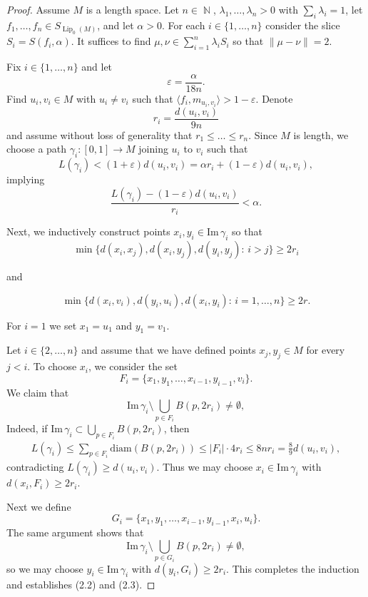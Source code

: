 \documentclass[10pt,a4paper]{amsart}
\DeclareMathOperator{\Lip}{Lip}
\DeclareMathOperator{\N}{\mathbb{N}}
\begin{document}
\begin{proof}
Assume $M$ is a length space. 
    Let $n\in \N$, $\lambda_1,\ldots,\lambda_n>0$ with $\sum_i\lambda_i=1$,
    let $f_1,\ldots,f_n\in S_{\Lip_0(M)}$, and let $\alpha>0$. For each $i\in \{1,\ldots,n\}$ consider the slice $S_i=S(f_i,\alpha)$. It suffices to find $\mu,\nu\in \sum_{i=1}^n \lambda_iS_i$ so that $\|\mu-\nu\|=2$.


Fix $i\in \{1,\ldots,n\}$ and let 
\[\varepsilon=\frac{\alpha}{18n}.\]  
Find $u_i,v_i\in M$ with $u_i\neq v_i$ such that
$\langle f_i,m_{u_i,v_i}\rangle>1-\varepsilon$. Denote
\[
r_i=\frac{d(u_i,v_i)}{9n}
\]
and assume without loss of generality that $r_1\leq\ldots\leq r_n$. 
Since $M$ is length, we choose a path $\gamma_i:[0,1]\to M$ joining $u_i$ to $v_i$
such that
\[L(\gamma_i)<(1+\varepsilon)d(u_i,v_i)=\alpha r_i+(1-\varepsilon)d(u_i,v_i),\]
implying
\begin{equation}
\frac{L(\gamma_i)-(1-\varepsilon)d(u_i,v_i)}{r_i}<\alpha.
\end{equation}


Next, we inductively construct points $x_i,y_i\in\mathrm{Im}\,\gamma_i$
so that
\begin{equation}
\min\{d(x_i,x_j),d(x_i,y_j),d(y_i,y_j):\, i>j\}\ge 2r_i
\end{equation}

and

\begin{equation}\tag{2.3}
\min\{d(x_i,v_i),d(y_i,u_i),d(x_i,y_i):\, i=1,\dots,n\}\ge 2r.
\end{equation}

For $i=1$ we set $x_1=u_1$ and $y_1=v_1$.

Let $i\in \{2,\ldots,n\}$ and assume that we have defined points $x_j,y_j\in M$ for every $j<i$. 
To choose $x_i$, we consider the set
\[
F_i=\{x_1,y_1,\dots,x_{i-1},y_{i-1},v_i\}.
\]
We claim that
\[
\mathrm{Im}\,\gamma_i
\setminus\bigcup_{p\in F_i} B(p,2r_i)
\neq\emptyset,
\]
Indeed, if $\mathrm{Im}\,\gamma_i\subset \bigcup_{p\in F_i}B(p,2r_i)$, then
\begin{align*}
 L(\gamma_i)
\le \sum_{p\in F_i}\mathrm{diam}(B(p,2r_i))
\le |F_i|\cdot 4r_i
\le
8nr_i
= \frac89 d(u_i,v_i),
\end{align*}
contradicting $L(\gamma_i)\geq d(u_i,v_i)$.
Thus we may choose $x_i\in\mathrm{Im}\,\gamma_i$
with $d(x_i,F_i)\ge 2r_i$.

Next we define
\[
G_i=\{x_1,y_1,\dots,x_{i-1},y_{i-1},x_i,u_i\}.
\]
The same argument shows that
\[
\mathrm{Im}\,\gamma_i
\setminus\bigcup_{p\in G_i} B(p,2r_i)
\neq\emptyset,
\]
so we may choose $y_i\in\mathrm{Im}\,\gamma_i$
with $d(y_i,G_i)\ge 2r_i$.
This completes the induction and establishes (2.2) and (2.3).


\end{proof}
\end{document}

